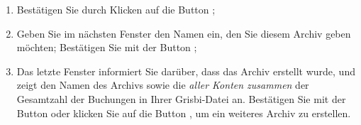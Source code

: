 \begin{enumerate}
\begin{itemize}
	
			\Note{}: Die letzte Zeile des Fensters zeigt entweder einen Fehler bei der Eingabe dieser Parameter (in Rot) oder die Anzahl der Buchungen an, die archiviert werden (alle Konten zusammen), bezogen auf die Gesamtzahl der Buchungen in Ihrer Grisbi-Datei.
		\end{itemize}
	\item Bestätigen Sie durch Klicken auf die Button ;
	\item Geben Sie im nächsten Fenster den Namen ein, den Sie diesem Archiv geben möchten; Bestätigen Sie mit der Button ;
	\item Das letzte Fenster informiert Sie darüber, dass das Archiv erstellt wurde, und zeigt den Namen des Archivs sowie die  \emph{aller Konten zusammen} der Gesamtzahl der Buchungen in Ihrer Grisbi-Datei an. Bestätigen Sie mit der Button  oder klicken Sie auf die Button , um ein weiteres Archiv zu erstellen.
\end{enumerate}

